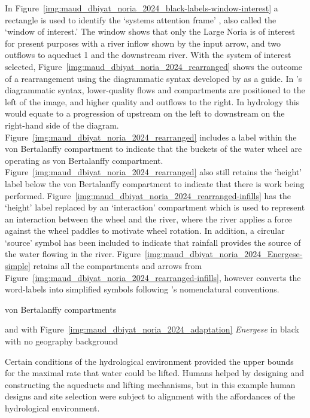 \documentclass[a4paper,12pt]{article}
\begin{document}
In Figure~\ref{img:maud_dbiyat_noria_2024_black-labels-window-interest} a rectangle is used to identify the `systems attention frame' \citep[p.~16]{odum_modeling_2000}, also called the `window of interest.' The window shows that only the Large Noria is of interest for present purposes with a river inflow shown by the input arrow, and two outflows to aqueduct 1 and the downstream river. With the system of interest selected, Figure~\ref{img:maud_dbiyat_noria_2024_rearranged} shows the outcome of a rearrangement using the diagrammatic syntax developed by \citeauthor{odum_modeling_2000} as a guide. In \citeauthor{odum_modeling_2000}'s diagrammatic syntax, lower-quality flows and compartments are positioned to the left of the image, and higher quality and outflows to the right. In hydrology this would equate to a progression of upstream on the left to downstream on the right-hand side of the diagram. Figure~\ref{img:maud_dbiyat_noria_2024_rearranged} includes a label within the von Bertalanffy compartment to indicate that the buckets of the water wheel are operating as von Bertalanffy compartment. Figure~\ref{img:maud_dbiyat_noria_2024_rearranged} also still retains the `height' label below the von Bertalanffy compartment to indicate that there is work being performed. Figure~\ref{img:maud_dbiyat_noria_2024_rearranged-infills} has the `height' label replaced by an `interaction' compartment which is used to represent an interaction between the wheel and the river, where the river applies a force against the wheel paddles to motivate wheel rotation. In addition, a circular `source' symbol has been included to indicate that rainfall provides the source of the water flowing in the river. Figure~\ref{img:maud_dbiyat_noria_2024_Energese-simple} retains all the compartments and arrows from Figure~\ref{img:maud_dbiyat_noria_2024_rearranged-infills}, however converts the word-labels into simplified symbols following \citeauthor{odum_modeling_2000}'s nomenclatural conventions.


von Bertalanffy compartments

and  with Figure~\ref{img:maud_dbiyat_noria_2024_adaptation}  \textit{Energese} in black with no geography background



Certain conditions of the hydrological environment provided the upper bounds for the maximal rate that water could be lifted. Humans helped by designing and constructing the aqueducts and lifting mechanisms, but in this example human designs and site selection were subject to alignment with the affordances of the hydrological environment.
\end{document}
